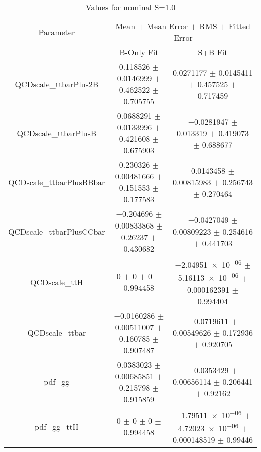 \begin{table}
\centering
\caption{Values for nominal S=1.0}
\begin{tabular}{ccc}
\toprule
Parameter & \multicolumn{2}{c}{Mean $\pm$ Mean Error $\pm$ RMS $\pm$ Fitted Error}\\
 & B-Only Fit & S+B Fit\\
\midrule
QCDscale\_ttbarPlus2B & \num{0.118526} $\pm$ \num{0.0146999} $\pm$ \num{0.462522} $\pm$ \num{0.705755} & \num{0.0271177} $\pm$ \num{0.0145411} $\pm$ \num{0.457525} $\pm$ \num{0.717459}\\
QCDscale\_ttbarPlusB & \num{0.0688291} $\pm$ \num{0.0133996} $\pm$ \num{0.421608} $\pm$ \num{0.675903} & \num{-0.0281947} $\pm$ \num{0.013319} $\pm$ \num{0.419073} $\pm$ \num{0.688677}\\
QCDscale\_ttbarPlusBBbar & \num{0.230326} $\pm$ \num{0.00481666} $\pm$ \num{0.151553} $\pm$ \num{0.177583} & \num{0.0143458} $\pm$ \num{0.00815983} $\pm$ \num{0.256743} $\pm$ \num{0.270464}\\
QCDscale\_ttbarPlusCCbar & \num{-0.204696} $\pm$ \num{0.00833868} $\pm$ \num{0.26237} $\pm$ \num{0.430682} & \num{-0.0427049} $\pm$ \num{0.00809223} $\pm$ \num{0.254616} $\pm$ \num{0.441703}\\
QCDscale\_ttH & \num{0} $\pm$ \num{0} $\pm$ \num{0} $\pm$ \num{0.994458} & \num{-2.04951e-06} $\pm$ \num{5.16113e-06} $\pm$ \num{0.000162391} $\pm$ \num{0.994404}\\
QCDscale\_ttbar & \num{-0.0160286} $\pm$ \num{0.00511007} $\pm$ \num{0.160785} $\pm$ \num{0.907487} & \num{-0.0719611} $\pm$ \num{0.00549626} $\pm$ \num{0.172936} $\pm$ \num{0.920705}\\
pdf\_gg & \num{0.0383023} $\pm$ \num{0.00685851} $\pm$ \num{0.215798} $\pm$ \num{0.915859} & \num{-0.0353429} $\pm$ \num{0.00656114} $\pm$ \num{0.206441} $\pm$ \num{0.92162}\\
pdf\_gg\_ttH & \num{0} $\pm$ \num{0} $\pm$ \num{0} $\pm$ \num{0.994458} & \num{-1.79511e-06} $\pm$ \num{4.72023e-06} $\pm$ \num{0.000148519} $\pm$ \num{0.99446}\\
\bottomrule
\end{tabular}
\end{table}